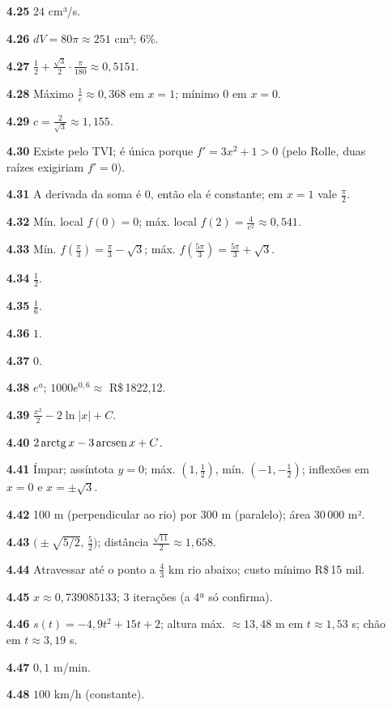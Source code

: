 {\begin{multicols}{2}
\begin{itemize}[leftmargin=2.7em,labelsep=0.5em,itemsep=1pt]
\item[\textbf{4.25}] $24$ cm³/s.
\item[\textbf{4.26}] $dV=80\pi\approx251$ cm³; $6\%$.
\item[\textbf{4.27}] $\tfrac12+\tfrac{\sqrt3}2\cdot\tfrac\pi{180}\approx0{,}5151$.
\item[\textbf{4.28}] Máximo $\tfrac1e\approx0{,}368$ em $x=1$; mínimo $0$ em $x=0$.
\item[\textbf{4.29}] $c=\tfrac{2}{\sqrt3}\approx1{,}155$.
\item[\textbf{4.30}] Existe pelo TVI; é única porque $f'=3x^2+1>0$ (pelo Rolle, duas raízes exigiriam $f'=0$).
\item[\textbf{4.31}] A derivada da soma é $0$, então ela é constante; em $x=1$ vale $\tfrac\pi2$.
\item[\textbf{4.32}] Mín. local $f(0)=0$; máx. local $f(2)=\tfrac4{e^2}\approx0{,}541$.
\item[\textbf{4.33}] Mín. $f(\tfrac\pi3)=\tfrac\pi3-\sqrt3$; máx. $f(\tfrac{5\pi}3)=\tfrac{5\pi}3+\sqrt3$.
\item[\textbf{4.34}] $\tfrac12$.
\item[\textbf{4.35}] $\tfrac16$.
\item[\textbf{4.36}] $1$.
\item[\textbf{4.37}] $0$.
\item[\textbf{4.38}] $e^a$; $1000e^{0{,}6}\approx$ R\$\,1822{,}12.
\item[\textbf{4.39}] $\tfrac{x^2}2-2\ln|x|+C$.
\item[\textbf{4.40}] $2\operatorname{arctg} x-3\operatorname{arcsen} x+C$.
\item[\textbf{4.41}] Ímpar; assíntota $y=0$; máx. $(1,\tfrac12)$, mín. $(-1,-\tfrac12)$; inflexões em $x=0$ e $x=\pm\sqrt3$.
\item[\textbf{4.42}] 100 m (perpendicular ao rio) por 300 m (paralelo); área 30\,000 m².
\item[\textbf{4.43}] $\big(\pm\sqrt{5/2},\,\tfrac52\big)$; distância $\tfrac{\sqrt{11}}{2}\approx1{,}658$.
\item[\textbf{4.44}] Atravessar até o ponto a $\tfrac43$ km rio abaixo; custo mínimo R\$\,15 mil.
\item[\textbf{4.45}] $x\approx0{,}739085133$; 3 iterações (a 4ª só confirma).
\item[\textbf{4.46}] $s(t)=-4{,}9t^2+15t+2$; altura máx. $\approx13{,}48$ m em $t\approx1{,}53$ s; chão em $t\approx3{,}19$ s.
\item[\textbf{4.47}] $0{,}1$ m/min.
\item[\textbf{4.48}] $100$ km/h (constante).

\end{itemize}
\end{multicols}}
